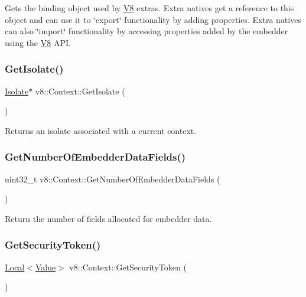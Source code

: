 Gets the binding object used by \mbox{\hyperlink{classv8_1_1V8}{V8}} extras. Extra natives get a reference to this object and can use it to \char`\"{}export\char`\"{} functionality by adding properties. Extra natives can also \char`\"{}import\char`\"{} functionality by accessing properties added by the embedder using the \mbox{\hyperlink{classv8_1_1V8}{V8}} A\+PI. \mbox{\label{classv8_1_1Context_a7b107f60b41f3fe05a600bd2b48983be}} 
\subsubsection{\texorpdfstring{Get\+Isolate()}{GetIsolate()}}
{\footnotesize\ttfamily \mbox{\hyperlink{classv8_1_1Isolate}{Isolate}}$\ast$ v8\+::\+Context\+::\+Get\+Isolate (\begin{DoxyParamCaption}{ }\end{DoxyParamCaption})}

Returns an isolate associated with a current context. \mbox{\label{classv8_1_1Context_a98e55c792203d20571f813e2c8ef4d5a}} 
\subsubsection{\texorpdfstring{Get\+Number\+Of\+Embedder\+Data\+Fields()}{GetNumberOfEmbedderDataFields()}}
{\footnotesize\ttfamily uint32\+\_\+t v8\+::\+Context\+::\+Get\+Number\+Of\+Embedder\+Data\+Fields (\begin{DoxyParamCaption}{ }\end{DoxyParamCaption})}

Return the number of fields allocated for embedder data. \mbox{\label{classv8_1_1Context_a59d7bc98684603ec4d9b1d1db2acaad8}} 
\subsubsection{\texorpdfstring{Get\+Security\+Token()}{GetSecurityToken()}}
{\footnotesize\ttfamily \mbox{\hyperlink{classv8_1_1Local}{Local}}$<$\mbox{\hyperlink{classv8_1_1Value}{Value}}$>$ v8\+::\+Context\+::\+Get\+Security\+Token (\begin{DoxyParamCaption}{ }\end{DoxyParamCaption})}

